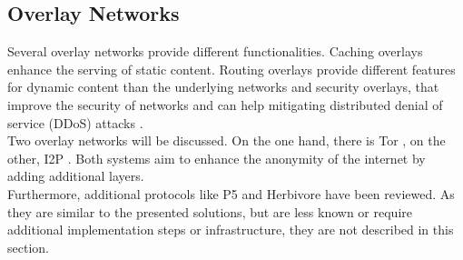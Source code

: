     \subsection{Overlay Networks}
        \label{subsec:related:overlay}
        Several overlay networks provide different functionalities. Caching overlays enhance the serving of static content. Routing overlays provide different features for dynamic content than the underlying networks and security overlays, that improve the security of networks and can help mitigating distributed denial of service (DDoS) attacks \cite{pathan_overlay_2014}.\\
        Two overlay networks will be discussed. On the one hand, there is Tor \cite{dingledine_tor_2004}, on the other, I2P \cite{zantout_i2p_2011}. Both systems aim to enhance the anonymity of the internet by adding additional layers.\\
        Furthermore, additional protocols like P5 \cite{sherwood_p_2005} and Herbivore \cite{goel_herbivore_2003} have been reviewed. As they are similar to the presented solutions, but are less known or require additional implementation steps or infrastructure, they are not described in this section.
     
     
